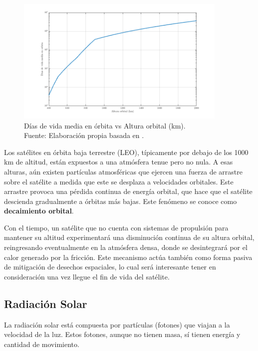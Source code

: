 \begin{figure}[H]
    \centering
    \includegraphics[width=0.9\textwidth]{3.Conceptos_Previos/Diasvidamediaorbitavsaltitud.png} 
    \caption{Días de vida media en órbita vs Altura orbital (km).\\ Fuente: Elaboración propia basada en \cite{spaceacademy_orblife}.}
    \label{fig:vida_media_orbita}
\end{figure}

Los satélites en órbita baja terrestre (LEO), típicamente por debajo de los 1000 km de altitud, están expuestos a una atmósfera tenue pero no nula. A esas alturas, aún existen partículas atmosféricas que ejercen una fuerza de arrastre sobre el satélite a medida que este se desplaza a velocidades orbitales. Este arrastre provoca una pérdida continua de energía orbital,  que hace que el satélite descienda gradualmente a órbitas más bajas. Este fenómeno se conoce como \textbf{decaimiento orbital}.

Con el tiempo, un satélite que no cuenta con sistemas de propulsión para mantener su altitud experimentará una disminución continua de su altura orbital, reingresando eventualmente en la atmósfera densa, donde se desintegrará por el calor generado por la fricción. Este mecanismo actúa también como forma pasiva de mitigación de desechos espaciales, lo cual será interesante tener en consideración una vez llegue el fin de vida del satélite.

\subsection{Radiación Solar}

La radiación solar está compuesta por partículas (fotones) que viajan a la velocidad de la luz. Estos fotones, aunque no tienen masa, sí tienen energía y cantidad de movimiento. 

